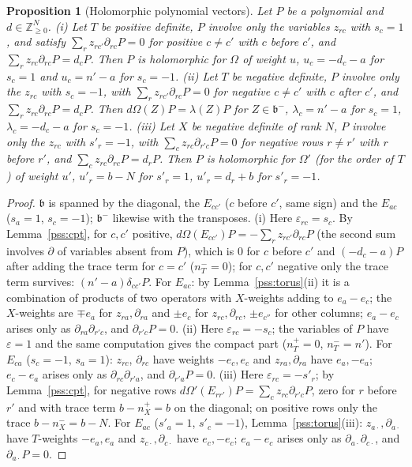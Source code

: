 \documentclass[10pt]{amsart}
\newtheorem{proposition}[theorem]{Proposition}
\theoremstyle{definition}
\theoremstyle{remark}
\newcommand{\Z}{\mathbb Z}
\begin{document}
\begin{proposition}[Holomorphic polynomial vectors]\label{pss:hol}
Let $P$ be a polynomial and $d\in\Z_{\ge0}^N$.
\textup{(i)} Let $T$ be positive definite, $P$ involve only the variables $z_{rc}$ with $s_c=1$, and
satisfy $\sum_rz_{rc'}\partial_{rc}P=0$ for positive $c\ne c'$ with $c$ before $c'$, and $\sum_rz_{rc}\partial_{rc}P=d_cP$.
Then $P$ is holomorphic for $\Omega$ of weight $u$, $u_c=-d_c-a$ for $s_c=1$ and $u_c=n'-a$ for $s_c=-1$.
\textup{(ii)} Let $T$ be negative definite, $P$ involve only the $z_{rc}$ with $s_c=-1$, with
$\sum_rz_{rc'}\partial_{rc}P=0$ for negative $c\ne c'$ with $c$ after $c'$, and $\sum_rz_{rc}\partial_{rc}P=d_cP$. Then
$d\Omega(Z)P=\lambda(Z)P$ for $Z\in\mathfrak b^-$, $\lambda_c=n'-a$ for $s_c=1$, $\lambda_c=-d_c-a$ for $s_c=-1$.
\textup{(iii)} Let $X$ be negative definite of rank $N$, $P$ involve only the $z_{rc}$ with $s'_r=-1$, with
$\sum_cz_{rc}\partial_{r'c}P=0$ for negative rows $r\ne r'$ with $r$ before $r'$, and $\sum_cz_{rc}\partial_{rc}P=d_rP$.
Then $P$ is holomorphic for $\Omega'$ \textup(for the order of $T$\textup) of weight $u'$, $u'_r=b-N$ for
$s'_r=1$, $u'_r=d_r+b$ for $s'_r=-1$.
\end{proposition}
\begin{proof}
$\mathfrak b$ is spanned by the diagonal, the $E_{cc'}$ ($c$ before $c'$, same sign) and the $E_{ac}$
($s_a=1$, $s_c=-1$); $\mathfrak b^-$ likewise with the transposes. (i) Here $\varepsilon_{rc}=s_c$. By
Lemma~\ref{pss:cpt}, for $c,c'$ positive, $d\Omega(E_{cc'})P=-\sum_rz_{rc'}\partial_{rc}P$ (the second sum
involves $\partial$ of variables absent from $P$), which is $0$ for $c$ before $c'$ and $(-d_c-a)P$ after
adding the trace term for $c=c'$ ($n_T^-=0$); for $c,c'$ negative only the trace term survives:
$(n'-a)\delta_{cc'}P$. For $E_{ac}$: by Lemma~\ref{pss:torus}(ii) it is a combination of products of two
operators with $X$-weights adding to $e_a-e_c$; the $X$-weights are $\mp e_a$ for $z_{ra},\partial_{ra}$ and
$\pm e_c$ for $z_{rc},\partial_{rc}$, $\pm e_{c''}$ for other columns; $e_a-e_c$ arises only as $\partial_{ra}\partial_{r'c}$,
and $\partial_{r'c}P=0$. (ii) Here $\varepsilon_{rc}=-s_c$; the variables of $P$ have $\varepsilon=1$ and the
same computation gives the compact part ($n_T^+=0$, $n_T^-=n'$). For $E_{ca}$ ($s_c=-1$, $s_a=1$): $z_{rc}$,
$\partial_{rc}$ have weights $-e_c,e_c$ and $z_{ra},\partial_{ra}$ have $e_a,-e_a$; $e_c-e_a$ arises only as
$\partial_{rc}\partial_{r'a}$, and $\partial_{r'a}P=0$. (iii) Here $\varepsilon_{rc}=-s'_r$; by Lemma~\ref{pss:cpt},
for negative rows $d\Omega'(E_{rr'})P=\sum_cz_{rc}\partial_{r'c}P$, zero for $r$ before $r'$ and with trace term
$b-n_X^+=b$ on the diagonal; on positive rows only the trace $b-n_X^-=b-N$. For $E_{ac}$ ($s'_a=1$,
$s'_c=-1$), Lemma~\ref{pss:torus}(iii): $z_{a\cdot},\partial_{a\cdot}$ have $T$-weights $-e_a,e_a$ and
$z_{c\cdot},\partial_{c\cdot}$ have $e_c,-e_c$; $e_a-e_c$ arises only as $\partial_{a\cdot}\partial_{c\cdot}$, and
$\partial_{a\cdot}P=0$.
\end{proof}
\end{document}
